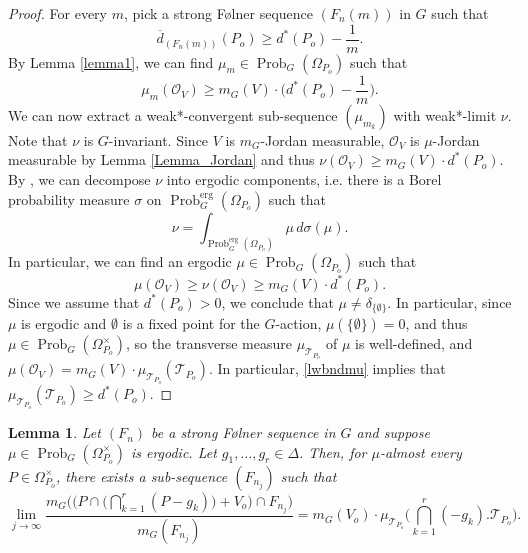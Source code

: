 \documentclass[12pt,reqno,a4paper]{amsart}
\numberwithin{equation}{section}
\newcommand{\cO}{\mathcal{O}}
\newcommand{\cT}{\mathcal{T}}
\newcommand{\ra}{\rightarrow}
\DeclareMathOperator{\Prob}{Prob}
\theoremstyle{theorem}
\newtheorem{lemma}[theorem]{Lemma}
\theoremstyle{task}
\theoremstyle{definition}
\begin{document}
\begin{proof}
For every $m$, pick a strong F\o lner sequence $(F_n(m))$ in $G$ such that
\[
\overline{d}_{(F_n(m))}(P_o) \geq d^*(P_o) - \frac{1}{m}.
\]
By Lemma \ref{lemma1}, we can find $\mu_m \in \Prob_G(\Omega_{P_o})$ such that 
\[
\mu_m(\cO_V) \geq m_G(V) \cdot \Big(d^*(P_o) - \frac{1}{m}\Big).
\]
We can now extract a weak*-convergent sub-sequence $(\mu_{m_k})$ with weak*-limit $\nu$. Note that $\nu$ is $G$-invariant. Since $V$ is $m_G$-Jordan measurable, $\cO_V$ is $\mu$-Jordan measurable by Lemma \ref{Lemma_Jordan} and thus $\nu(\cO_V) \geq m_G(V) \cdot d^*(P_o)$. By \cite[Theorem 8.20]{EW}, we can decompose $\nu$ into ergodic components, 
i.e. there is a Borel probability measure $\sigma$ on $\Prob_G^{\textrm{erg}}(\Omega_{P_o})$ such that
\[
\nu = \int_{\Prob_G^{\textrm{erg}}(\Omega_{P_o})} \mu \, d\sigma(\mu).
\]
In particular, we can find an ergodic $\mu \in \Prob_G(\Omega_{P_o})$ such that
\begin{equation}
\label{lwbndmu}
\mu(\cO_V) \geq \nu(\cO_V) \geq m_G(V) \cdot d^*(P_o).
\end{equation}
Since we assume that $d^*(P_o) > 0$, we conclude that $\mu \neq \delta_{\{\emptyset\}}$. In particular, since $\mu$ is ergodic and $\emptyset$ is a fixed point for the $G$-action, $\mu(\{\emptyset\}) = 0$, and thus $\mu \in \Prob_G(\Omega_{P_o}^{\times})$, so the transverse measure $\mu_{\cT_{P_o}}$ of $\mu$ is well-defined, and $\mu(\cO_V) = m_G(V) \cdot \mu_{\cT_{P_o}}(\cT_{P_o})$.
In particular, \eqref{lwbndmu} implies that $\mu_{\cT_{P_o}}(\cT_{P_o}) \geq d^*(P_o)$. 
\end{proof}

\begin{lemma}
\label{lemma3}
Let $(F_n)$ be a strong F\o lner sequence in $G$ and suppose $\mu \in \Prob_G(\Omega_{P_o}^{\times})$ is ergodic. Let $g_1,\ldots,g_r \in \Delta$. 
Then, for $\mu$-almost every $P \in \Omega_{P_o}^{\times}$, there exists a 
sub-sequence $(F_{n_j})$ such that
\[
\lim_{j \ra \infty}
\frac{m_G\big(\big(P \cap \big(\bigcap_{k=1}^r (P-g_k)\big)+V_o\big) \cap F_{n_j}\big)}{m_G(F_{n_j})}
= m_G(V_o) \cdot \mu_{\cT_{P_o}}\big(\bigcap_{k=1}^r (-g_k).\cT_{P_o}\big).
\]
\end{lemma}
\end{document}
